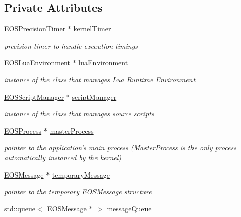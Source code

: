 \subsection*{Private Attributes}
\begin{CompactItemize}
\item 
EOSPrecisionTimer $\ast$ \hyperlink{structEOSKernel_cf859572d0066a9f3b14276c39d33845}{kernelTimer}
\begin{CompactList}\small\item\em precision timer to handle execution timings \item\end{CompactList}\item 
\hyperlink{classEOSLuaEnvironment}{EOSLuaEnvironment} $\ast$ \hyperlink{structEOSKernel_5b6a6d064e015c2db02ed67ca224f080}{luaEnvironment}
\begin{CompactList}\small\item\em instance of the class that manages Lua Runtime Environment \item\end{CompactList}\item 
\hyperlink{classEOSScriptManager}{EOSScriptManager} $\ast$ \hyperlink{structEOSKernel_b48245e1274b86370aebc583430b9199}{scriptManager}
\begin{CompactList}\small\item\em instance of the class that manages source scripts \item\end{CompactList}\item 
\hyperlink{classEOSProcess}{EOSProcess} $\ast$ \hyperlink{structEOSKernel_7224243c464c099b92494f3a06eeb99e}{masterProcess}
\begin{CompactList}\small\item\em pointer to the application's main process (MasterProcess is the only process automatically instanced by the kernel) \item\end{CompactList}\item 
\hyperlink{classEOSMessage}{EOSMessage} $\ast$ \hyperlink{structEOSKernel_a755627acbc4b4b61d4fcbdef216baef}{temporaryMessage}
\begin{CompactList}\small\item\em pointer to the temporary \hyperlink{classEOSMessage}{EOSMessage} structure \item\end{CompactList}\item 
std::queue$<$ \hyperlink{classEOSMessage}{EOSMessage} $\ast$ $>$ \hyperlink{structEOSKernel_e6cc8ecb01686b6284ec7fb8ce2d376f}{messageQueue}

\end{CompactItemize}
